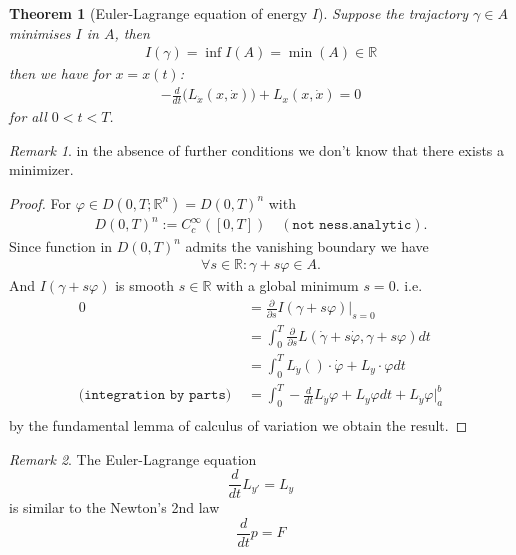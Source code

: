 \documentclass[a4paper,11pt,oneside,fleqn]{book}
\newtheorem{theorem}{Theorem}[section]
\theoremstyle{definition}
\theoremstyle{remark}
\newtheorem*{remark}{Remark}
\begin{document}
\begin{theorem}[Euler-Lagrange equation of energy $I$]
	Suppose the trajactory $\gamma \in A$ minimises $I$ in $A$, then 
	\begin{align*}
		I(\gamma) = \inf I(A) = \min (A) \in \mathbb{R}
	\end{align*}
	then we have for $x = x(t)$:
	\begin{align*}
		-\frac{d}{d t}\bigg(L_{\dot{x}}(x, \dot{x})\bigg) + L_x(x, \dot{x}) = 0
	\end{align*}
	for all $0 < t< T$. 
\end{theorem}
\begin{remark}
in the absence of further conditions we don't know that there exists a minimizer. 
\end{remark}
\begin{proof}
	For $\varphi \in D(0, T; \mathbb{R}^n) = D(0, T)^n$ with
	\begin{align*}
		D(0, T)^n:=   C^\infty_c([0, T])
		\quad(\texttt{not ness.analytic}).
	\end{align*} 
	Since function in $D(0, T)^n$ admits the vanishing boundary we have
	\begin{align*}
		\forall s \in \mathbb{R}: \gamma + s \varphi \in A.
	\end{align*}
	And $I(\gamma + s \varphi)$ is smooth $s \in \mathbb{R}$ with a global minimum $s = 0$. i.e.
	\begin{align*}
		0&= \frac{\partial}{\partial s }I( \gamma + s \varphi)|_{s = 0}\\
		&= \int_0^T \frac{\partial}{\partial s }L (\dot{\gamma} + s \dot{\varphi}, \gamma + s \varphi) dt\\
		&= \int_0^T L_{\dot{y}}()\cdot  \dot{\varphi} + L_y \cdot  \varphi dt\\
		\texttt{(integration by parts) }
		&= \int_0^T -  \frac{d}{dt} L_{\dot{y}} \varphi + L_y \varphi dt + L_{\dot{y}} \varphi |_a^b\\
	\end{align*}
	by the fundamental lemma of calculus of variation we obtain the result. 
\end{proof}
\begin{remark}
The Euler-Lagrange equation 
\begin{equation}
	\frac{d}{dt}L_{y'} = L_y
\end{equation}
is similar to the Newton's 2nd law
\begin{equation}
	\frac{d}{dt} p = F
\end{equation}
\end{remark}
\end{document}
